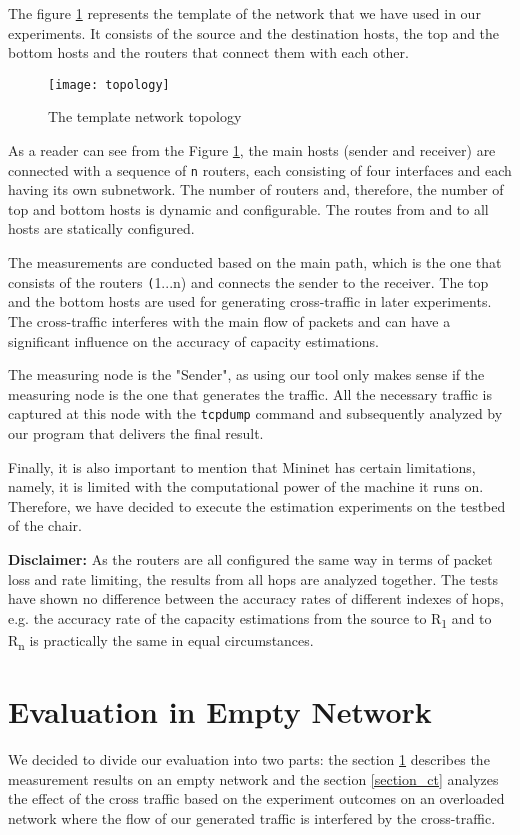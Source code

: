 The figure \ref{topology} represents the template of the network that we have used in our experiments. It consists of the source and the destination hosts, the top and the bottom hosts and the routers that connect them with each other. 

\begin{figure}[h]
 \centering
	 \texttt{[image: topology]}
 \caption{The template network topology}
 \label{topology}
\end{figure}

As a reader can see from the Figure \ref{topology}, the main hosts (sender and receiver) are connected with a sequence of \texttt{n} routers, each consisting of four interfaces and each having its own subnetwork. The number of routers and, therefore, the number of top and bottom hosts is dynamic and configurable. The routes from and to all hosts are statically configured.

The measurements are conducted based on the main path, which is the one that consists of the routers \texttt(1...n) and connects the sender to the receiver. The top and the bottom hosts are used for generating cross-traffic in later experiments. The cross-traffic interferes with the main flow of packets and can have a significant influence on the accuracy of capacity estimations.

The measuring node is the "Sender", as using our tool only makes sense if the measuring node is the one that generates the traffic. All the necessary traffic is captured at this node with the \texttt{tcpdump} command and subsequently analyzed by our program that delivers the final result.

Finally, it is also important to mention that Mininet has certain limitations, namely, it is limited with the computational power of the machine it runs on. Therefore, we have decided to execute the estimation experiments on the testbed of the chair.

\textbf{Disclaimer:} As the routers are all configured the same way in terms of packet loss and  rate limiting, the results from all hops are analyzed together. The tests have shown no difference between the accuracy rates of different indexes of hops, e.g. the accuracy rate of the capacity estimations from the source to R\textsubscript{1} and to R\textsubscript{n} is practically the same in equal circumstances.

\section{Evaluation in Empty Network}
\label{empty_net}
We decided to divide our evaluation into two parts: the section \ref{empty_net} describes the measurement results on an empty network and the section \ref{section_ct} analyzes the effect of the cross traffic based on the experiment outcomes on an overloaded network where the flow of our generated traffic is interfered by the cross-traffic. 

